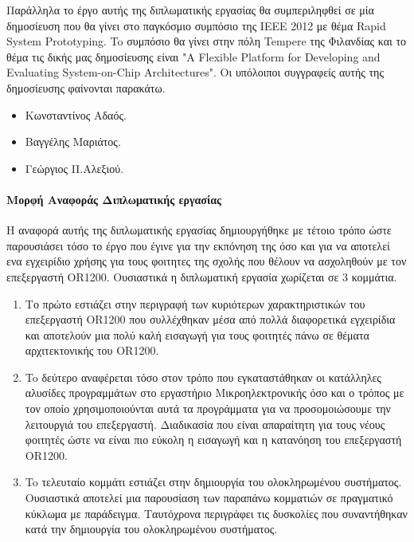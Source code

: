 \documentclass[a4paper,10pt]{article}
\numberwithin{figure}{section}
\numberwithin{table}{section}
\begin{document}
Παράλληλα το έργο αυτής της διπλωματικής εργασίας θα συμπεριληφθεί σε μία δημοσίευση που θα γίνει στο παγκόσμιο συμπόσιο της ΙΕΕΕ 2012 με θέμα Rapid System Prototyping. To συμπόσιο θα γίνει στην πόλη Tempere της Φιλανδίας και το θέμα τις δικής μας δημοσίευσης είναι "A Flexible Platform for Developing and Evaluating System-on-Chip Architectures". Οι υπόλοιποι συγγραφείς αυτής της δημοσίευσης φαίνονται παρακάτω.
\newpage
\begin{itemize}
 \item Κωνσταντίνος Αδαός.
 \item Βαγγέλης Μαριάτος.
 \item Γεώργιος Π.Αλεξιού.
\end{itemize}


\paragraph{\newline\newline Μορφή Αναφοράς Διπλωματικής εργασίας\newline\newline}

Η αναφορά αυτής της διπλωματικής εργασίας δημιουργήθηκε με τέτοιο τρόπο ώστε παρουσιάσει τόσο το έργο που έγινε για την εκπόνηση της όσο και για να αποτελεί ενα εγχειρίδιο χρήσης για τους φοιτητες της σχολής που θέλουν να ασχοληθούν με τον επεξεργαστή OR1200. Ουσιαστικά η διπλωματική εργασία χωρίζεται σε 3 κομμάτια. 

\begin{enumerate}
 \item Το πρώτο εστιάζει στην περιγραφή των κυριότερων χαρακτηριστικών του επεξεργαστή ΟR1200 που συλλέχθηκαν μέσα από πολλά διαφορετικά εγχειρίδια και αποτελούν μια πολύ καλή εισαγωγή για τους φοιτητές πάνω σε θέματα αρχιτεκτονικής του OR1200. 
 \item To δεύτερο αναφέρεται τόσο στον τρόπο που εγκαταστάθηκαν οι κατάλληλες αλυσίδες προγραμμάτων στο εργαστήριο Μικροηλεκτρονικής όσο και ο τρόπος με τον οποίο χρησιμοποιούνται αυτά τα προγράμματα για να προσομοιώσουμε την λειτουργιά του επεξεργαστή. Διαδικασία που είναι απαραίτητη για τους νέους φοιτητές ώστε να είναι πιο εύκολη η εισαγωγή και η κατανόηση του επεξεργαστή OR1200.  
 \item To τελευταίο κομμάτι εστιάζει στην δημιουργία του ολοκληρωμένου συστήματος. Ουσιαστικά αποτελεί μια παρουσίαση των παραπάνω κομματιών σε πραγματικό κύκλωμα με παράδειγμα. Ταυτόχρονα περιγράφει τις δυσκολίες που συναντήθηκαν κατά την δημιουργία του ολοκληρωμένου συστήματος.
\end{enumerate}
\end{document}
